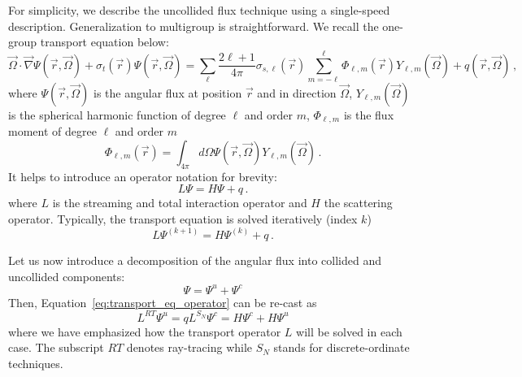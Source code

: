 \documentclass[12pt]{scrartcl}
\newcommand{\grad}{\vec{\nabla}}
\newcommand{\eqt}[1]{Equation~\ref{#1}}                     %
\begin{document}
For simplicity, we describe the uncollided flux technique using a single-speed description. Generalization to multigroup is straightforward.
We recall the one-group transport equation below:
\begin{equation}
\label{eq:transport_eq}
\vec{\Omega} \cdot \grad \Psi(\vec{r},\vec{\Omega}) + \sigma_t(\vec{r}) \Psi(\vec{r},\vec{\Omega}) = 
\sum_\ell \frac{2\ell+1}{4\pi}\sigma_{s,\ell}(\vec{r}) \sum_{m=-\ell}^{\ell} \Phi_{\ell,m}(\vec{r})Y_{\ell,m}(\vec{\Omega}) 
+ q(\vec{r},\vec{\Omega}) \,,
\end{equation}
where $\Psi(\vec{r},\vec{\Omega})$ is the angular flux at position $\vec{r}$ and in direction $\vec{\Omega}$, $Y_{\ell,m}(\vec{\Omega}) $ is the spherical harmonic function of degree $\ell$ and order $m$, $\Phi_{\ell,m}$ is the flux moment of degree $\ell$ and order $m$
\[
 \Phi_{\ell,m}(\vec{r}) = \int_{4\pi} d\Omega  \Psi(\vec{r},\vec{\Omega}) Y_{\ell,m}(\vec{\Omega}) \,.
\]
It helps to introduce an operator notation for brevity:
\begin{equation}
\label{eq:transport_eq_operator}
L\Psi = H\Psi +q \,.
\end{equation}
where $L$ is the streaming and total interaction operator and $H$ the scattering operator. 
Typically, the transport equation is solved iteratively (index $k$)
\begin{equation}
L\Psi^{(k+1)} = H\Psi^{(k)} +q \,.
\end{equation}

Let us now introduce a decomposition of the angular flux into collided and uncollided components:
\[
\Psi = \Psi^u + \Psi^c
\]
Then, \eqt{eq:transport_eq_operator} can be re-cast as
\begin{subequations}
\begin{equation}
\label{eq:_transport_eq_uncoll}
L^{RT}\Psi^u = q 
\end{equation}
\begin{equation}
\label{eq:_transport_eq_coll}
L^{S_N}\Psi^c = H\Psi^c + H\Psi^u 
\end{equation}
\end{subequations}
where we have emphasized how the transport operator $L$ will be solved in each case. The subscript $RT$ denotes ray-tracing
while  $S_N$ stands for discrete-ordinate techniques.
\end{document}
